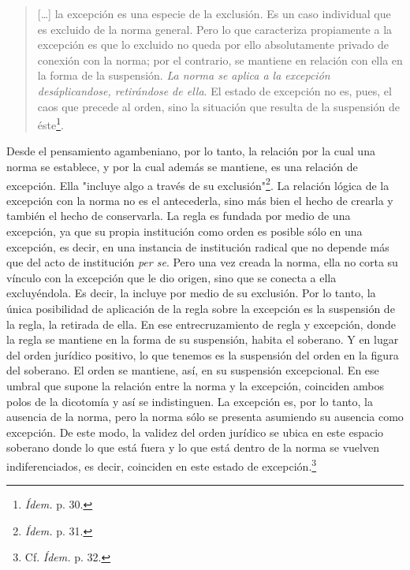 \documentclass{book}
\begin{document}
\begin{quote}
{[}\ldots{]} la excepción es una especie de la exclusión. Es un caso
individual que es excluido de la norma general. Pero lo que caracteriza
propiamente a la excepción es que lo excluido no queda por ello
absolutamente privado de conexión con la norma; por el contrario, se
mantiene en relación con ella en la forma de la suspensión. \emph{La
norma se aplica a la excepción desáplicandose, retirándose de ella}. El
estado de excepción no es, pues, el caos que precede al orden, sino la
situación que resulta de la suspensión de éste\footnote{\emph{Ídem.} p.
  30.}.
\end{quote}

Desde el pensamiento agambeniano, por lo tanto, la relación por la cual
una norma se establece, y por la cual además se mantiene, es una
relación de excepción. Ella "incluye algo a través de su
exclusión"\footnote{\emph{Ídem.} p. 31.}. La relación lógica de la
excepción con la norma no es el antecederla, sino más bien el hecho de
crearla y también el hecho de conservarla. La regla es fundada por medio
de una excepción, ya que su propia institución como orden es posible
sólo en una excepción, es decir, en una instancia de institución radical
que no depende más que del acto de institución \emph{per se}. Pero una
vez creada la norma, ella no corta su vínculo con la excepción que le
dio origen, sino que se conecta a ella excluyéndola. Es decir, la
incluye por medio de su exclusión. Por lo tanto, la única posibilidad de
aplicación de la regla sobre la excepción es la suspensión de la regla,
la retirada de ella. En ese entrecruzamiento de regla y excepción, donde
la regla se mantiene en la forma de su suspensión, habita el soberano. Y
en lugar del orden jurídico positivo, lo que tenemos es la suspensión
del orden en la figura del soberano. El orden se mantiene, así, en su
suspensión excepcional. En ese umbral que supone la relación entre la
norma y la excepción, coinciden ambos polos de la dicotomía y así se
indistinguen. La excepción es, por lo tanto, la ausencia de la norma,
pero la norma sólo se presenta asumiendo su ausencia como excepción. De
este modo, la validez del orden jurídico se ubica en este espacio
soberano donde lo que está fuera y lo que está dentro de la norma se
vuelven indiferenciados, es decir, coinciden en este estado de
excepción.\footnote{Cf. \emph{Ídem.} p. 32.}
\end{document}
